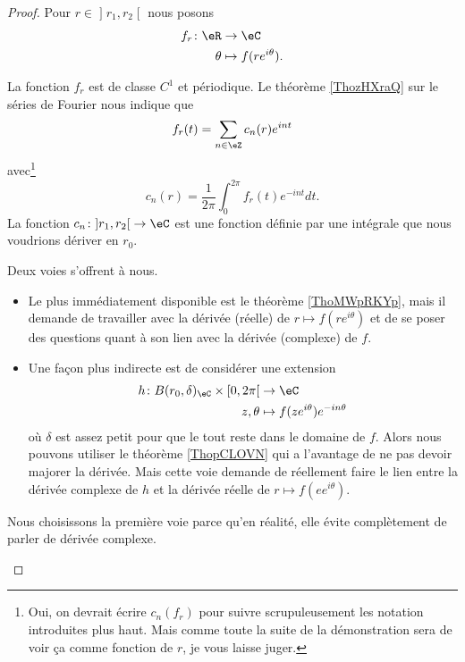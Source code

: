 \begin{proof}
    Pour \( r\in\mathopen] r_1 , r_2 \mathclose[\) nous posons
        \begin{equation}
            \begin{aligned}
                f_r\colon \eR&\to \eC \\
                \theta&\mapsto f(r e^{i\theta}). 
            \end{aligned}
        \end{equation}
        \begin{subproof}
        \item[Coeffcients de Fourier]
        La fonction \( f_r\) est de classe \( C^1\) et périodique. Le théorème \ref{ThozHXraQ} sur le séries de Fourier nous indique que
        \begin{equation}    \label{EQooIHQRooZWqJKL}
            f_r(t)=\sum_{n\in \eZ}c_n(r) e^{int}
        \end{equation}
        avec\footnote{Oui, on devrait écrire \( c_n(f_r)\) pour suivre scrupuleusement les notation introduites plus haut. Mais comme toute la suite de la démonstration sera de voir ça comme fonction de \( r\), je vous laisse juger.}
        \begin{equation}
            c_n(r)=\frac{1}{ 2\pi }\int_0^{2\pi}f_r(t) e^{-int}dt.
        \end{equation}
    La fonction \( c_n\colon \mathopen] r_1 , r_2 \mathclose[\to \eC\) est une fonction définie par une intégrale que nous voudrions dériver en \( r_0\). 
    \item[Digression]
        Deux voies s'offrent à nous.
        \begin{itemize}
            \item Le plus immédiatement disponible est le théorème \ref{ThoMWpRKYp}, mais il demande de travailler avec la dérivée (réelle) de \( r\mapsto f(r e^{i\theta})\) et de se poser des questions quant à son lien avec la dérivée (complexe) de \( f\).
            \item Une façon plus indirecte est de considérer une extension
                \begin{equation}
                    \begin{aligned}
                        h\colon B(r_0,\delta)_{\eC}\times \mathopen[ 0 , 2\pi \mathclose[&\to \eC \\
                            z,\theta&\mapsto f(z e^{i\theta}) e^{-in\theta} 
                    \end{aligned}
                \end{equation}
                où \( \delta\) est assez petit pour que le tout reste dans le domaine de \( f\). Alors nous pouvons utiliser le théorème \ref{ThopCLOVN} qui a l'avantage de ne pas devoir majorer la dérivée. Mais cette voie demande de réellement faire le lien entre la dérivée complexe de \( h\) et la dérivée réelle de \( r\mapsto f(e e^{i\theta})\).
        \end{itemize}
        Nous choisissons la première voie parce qu'en réalité, elle évite complètement de parler de dérivée complexe.


\end{subproof}
\end{proof}
